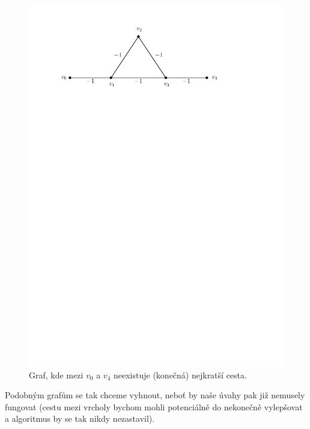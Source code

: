 \begin{figure}[h]
    \centering
    \includegraphics[scale=\graphimgsize]{components/images/ch01_zapor_ohod_graf.pdf}
    \caption{Graf, kde mezi $v_0$ a $v_4$ neexistuje (konečná) nejkratší cesta.}
    \label{fig:zapor_ohod_graf}
\end{figure}
Podobným grafům se tak chceme vyhnout, neboť by naše úvahy pak již nemusely fungovat (cestu mezi vrcholy bychom mohli potenciálně do nekonečně vylepšovat a algoritmus by se tak nikdy nezastavil).

